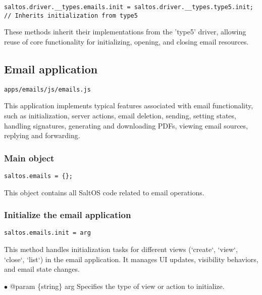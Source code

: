 \documentclass[a4paper]{article}
\begin{document}
\begin{lstlisting}
saltos.driver.__types.emails.init = saltos.driver.__types.type5.init; // Inherits initialization from type5
\end{lstlisting}

These methods inherit their implementations from the 'type5' driver, allowing
reuse of core functionality for initializing, opening, and closing email resources.

\hypertarget{toc49}{}
\subsection{Email application}

\begin{lstlisting}
apps/emails/js/emails.js
\end{lstlisting}

This application implements typical features associated with email functionality,
such as initialization, server actions, email deletion, sending, setting states,
handling signatures, generating and downloading PDFs, viewing email sources, replying
and forwarding.

\hypertarget{toc50}{}
\subsubsection{Main object}

\begin{lstlisting}
saltos.emails = {};
\end{lstlisting}

This object contains all SaltOS code related to email operations.

\hypertarget{toc51}{}
\subsubsection{Initialize the email application}

\begin{lstlisting}
saltos.emails.init = arg
\end{lstlisting}

This method handles initialization tasks for different views (`create`, `view`, `close`, `list`)
in the email application. It manages UI updates, visibility behaviors, and email state changes.

\begin{compactitem}
\item[\color{myblue}$\bullet$] @param \{string\} arg Specifies the type of view or action to initialize.
\end{compactitem}
\end{document}
